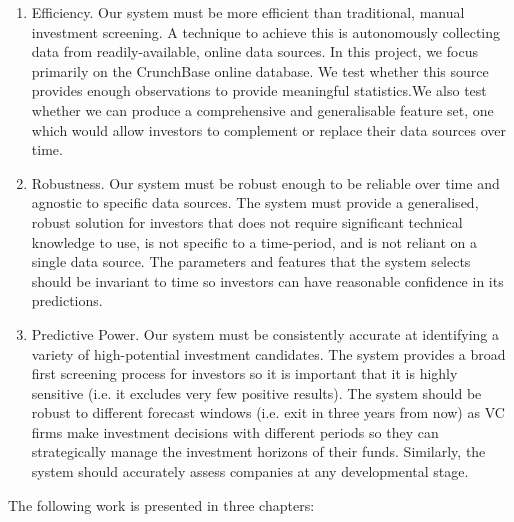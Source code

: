\documentclass[../thesis/thesis.tex]{subfiles}
\begin{document}
\begin{enumerate}

\item Efficiency. Our system must be more efficient than traditional, manual investment screening. A technique to achieve this is autonomously collecting data from readily-available, online data sources. In this project, we focus primarily on the CrunchBase online database. We test whether this source provides enough observations to provide meaningful statistics.We also test whether we can produce a comprehensive and generalisable feature set, one which would allow investors to complement or replace their data sources over time.

\item Robustness. Our system must be robust enough to be reliable over time and agnostic to specific data sources. The system must provide a generalised, robust solution for investors that does not require significant technical knowledge to use, is not specific to a time-period, and is not reliant on a single data source. The parameters and features that the system selects should be invariant to time so investors can have reasonable confidence in its predictions.

\item Predictive Power. Our system must be consistently accurate at identifying a variety of high-potential investment candidates. The system provides a broad first screening process for investors so it is important that it is highly sensitive (i.e. it excludes very few positive results). The system should be robust to different forecast windows (i.e. exit in three years from now) as VC firms make investment decisions with different periods so they can strategically manage the investment horizons of their funds. Similarly, the system should accurately assess companies at any developmental stage.

\end{enumerate}

The following work is presented in three chapters:
\end{document}
